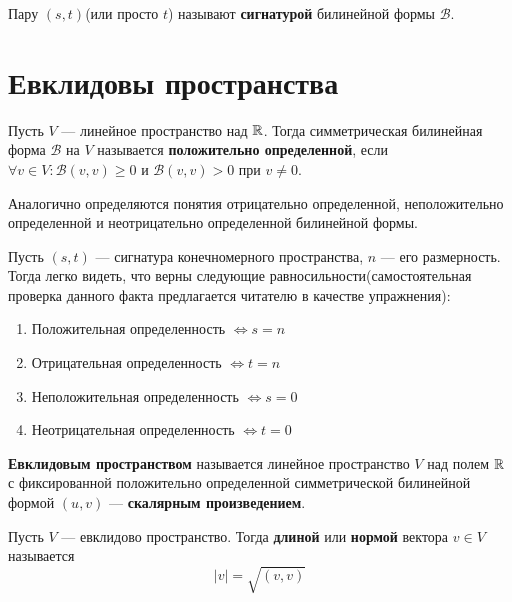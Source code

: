 \documentclass[../main.tex]{subfiles}
\begin{document}
\begin{definition}
  Пару $(s, t)$(или просто $t$) называют \textbf{сигнатурой} билинейной формы $\mathcal{B}$.
\end{definition}

\section{Евклидовы пространства}

\begin{definition}
  Пусть $V$ --- линейное пространство над $\mathbb{R}$. Тогда симметрическая билинейная форма $\mathcal{B}$ на $V$ называется \textbf{положительно определенной}, если $\forall v \in V\colon \mathcal{B}(v, v) \geq 0$ и $\mathcal{B}(v, v) > 0$ при $v \neq 0$.
\end{definition}

\begin{remark}
  Аналогично определяются понятия отрицательно определенной, неположительно определенной и неотрицательно определенной билинейной формы.
\end{remark}

\begin{remark}
  Пусть $(s, t)$ --- сигнатура конечномерного пространства, $n$ --- его размерность. Тогда легко видеть, что верны следующие равносильности(самостоятельная проверка данного факта предлагается читателю в качестве упражнения):
  \begin{enumerate}
    \item Положительная определенность $\iff s = n$
    \item Отрицательная определенность $\iff t = n$
    \item Неположительная определенность $\iff s = 0$
    \item Неотрицательная определенность $\iff t = 0$
  \end{enumerate}
\end{remark}

\begin{definition}
  \textbf{Евклидовым пространством} называется линейное пространство $V$ над полем $\mathbb{R}$ с фиксированной положительно определенной симметрической билинейной формой $(u, v)$ --- \textbf{скалярным произведением}.
\end{definition}

\begin{definition}
  Пусть $V$ --- евклидово пространство. Тогда \textbf{длиной} или \textbf{нормой} вектора $v \in V$ называется
  \begin{equation*}
    | v | = \sqrt{(v, v)}
  \end{equation*}
\end{definition}
\end{document}
